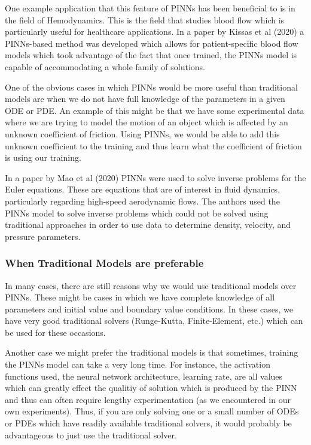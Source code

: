 \documentclass{article}
\begin{document}
One example application that this feature of PINNs has been beneficial to is in the field of Hemodynamics. This is the field that studies blood flow which is particularly useful for healthcare applications. In a paper by Kissas et al (2020) a PINNs-based method was developed which allows for patient-specific blood flow models which took advantage of the fact that once trained, the PINNs model is capable of accommodating a whole family of solutions. 

One of the obvious cases in which PINNs would be more useful than traditional models are when we do not have full knowledge of the parameters in a given ODE or PDE. An example of this might be that we have some experimental data where we are trying to model the motion of an object which is affected by an unknown coefficient of friction. Using PINNs, we would be able to add this unknown coefficient to the training and thus learn what the coefficient of friction is using our training.

In a paper by Mao et al (2020) PINNs were used to solve inverse problems for the Euler equations. These are equations that are of interest in fluid dynamics, particularly regarding high-speed aerodynamic flows. The authors used the PINNs model to solve inverse problems which could not be solved using traditional approaches in order to use data to determine density, velocity, and pressure parameters.

\subsubsection{When Traditional Models are preferable}

In many cases, there are still reasons why we would use traditional models over PINNs. These might be cases in which we have complete knowledge of all parameters and initial value and boundary value conditions. In these cases, we have very good traditional solvers (Runge-Kutta, Finite-Element, etc.) which can be used for these occasions.

Another case we might prefer the traditional models is that sometimes, training the PINNs model can take a very long time. For instance, the activation functions used, the neural network architecture, learning rate, are all values which can greatly effect the qualitiy of solution which is produced by the PINN and thus can often require lengthy experimentation (as we encountered in our own experiments). Thus, if you are only solving one or a small number of ODEs or PDEs which have readily available traditional solvers, it would probably be advantageous to just use the traditional solver.
\end{document}
